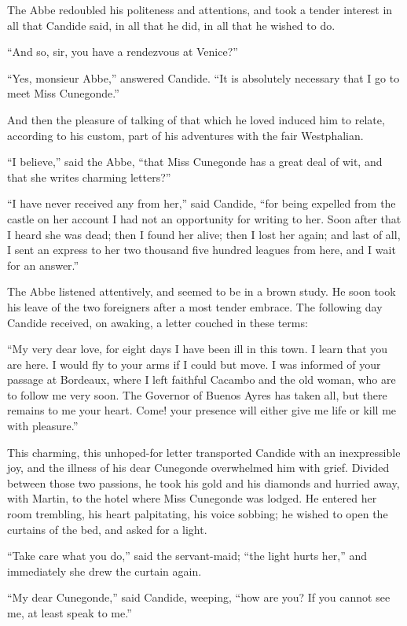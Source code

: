 The Abbe redoubled his politeness and attentions, and took a tender interest in all that Candide said, in all that he did, in all that he wished to do.

``And so, sir, you have a rendezvous at Venice?''

``Yes, monsieur Abbe,'' answered Candide. ``It is absolutely necessary that I go to meet Miss Cunegonde.''

And then the pleasure of talking of that which he loved induced him to relate, according to his custom, part of his adventures with the fair Westphalian.

``I believe,'' said the Abbe, ``that Miss Cunegonde has a great deal of wit, and that she writes charming letters?''

``I have never received any from her,'' said Candide, ``for being expelled from the castle on her account I had not an opportunity for writing to her. Soon after that I heard she was dead; then I found her alive; then I lost her again; and last of all, I sent an express to her two thousand five hundred leagues from here, and I wait for an answer.''

The Abbe listened attentively, and seemed to be in a brown study. He soon took his leave of the two foreigners after a most tender embrace. The following day Candide received, on awaking, a letter couched in these terms:

``My very dear love, for eight days I have been ill in this town. I learn that you are here. I would fly to your arms if I could but move. I was informed of your passage at Bordeaux, where I left faithful Cacambo and the old woman, who are to follow me very soon. The Governor of Buenos Ayres has taken all, but there remains to me your heart. Come! your presence will either give me life or kill me with pleasure.''

This charming, this unhoped-for letter transported Candide with an inexpressible joy, and the illness of his dear Cunegonde overwhelmed him with grief. Divided between those two passions, he took his gold and his diamonds and hurried away, with Martin, to the hotel where Miss Cunegonde was lodged. He entered her room trembling, his heart palpitating, his voice sobbing; he wished to open the curtains of the bed, and asked for a light.

``Take care what you do,'' said the servant-maid; ``the light hurts her,'' and immediately she drew the curtain again.

``My dear Cunegonde,'' said Candide, weeping, ``how are you? If you cannot see me, at least speak to me.''

